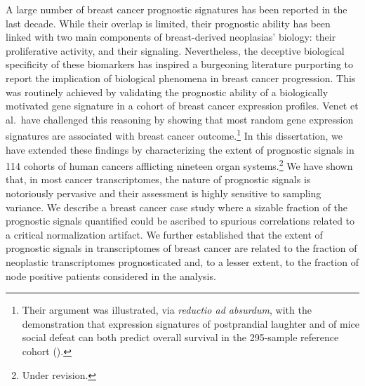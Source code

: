
A large number of breast cancer prognostic signatures has been reported in the
last decade.\cite{liu_breast_2014} While their overlap is limited, their
prognostic ability has been linked with two main components of breast-derived
neoplasias' biology: their proliferative activity, and their 
signaling.  Nevertheless, the deceptive biological specificity of these
biomarkers has inspired a burgeoning literature purporting to report the
implication of biological phenomena in breast cancer progression.  This was
routinely achieved by validating the prognostic ability of a biologically
motivated gene signature in a cohort of breast cancer expression
profiles.\cite{chang_gene_2004} Venet et al.~have challenged this reasoning by
showing that most random gene expression signatures are associated with breast
cancer outcome.\footnote{Their argument was illustrated, via \emph{reductio ad
    absurdum}, with the demonstration that expression signatures of postprandial
  laughter and of mice social defeat can both predict overall survival in the
  \mbox{295-sample}  reference cohort
  (\citealp{venet_most_2011}).}  In this dissertation, we have extended these
findings by characterizing the extent of prognostic signals in 114 cohorts of
human cancers afflicting nineteen organ systems.\footnote{Under revision.}  We
have shown that, in most cancer transcriptomes, the nature of prognostic signals
is notoriously pervasive and their assessment is highly sensitive to sampling
variance.  We describe a breast cancer case study where a sizable fraction of
the prognostic signals quantified could be ascribed to spurious correlations
related to a critical normalization artifact.  We further established that the
extent of prognostic signals in transcriptomes of breast cancer are related to
the fraction of  neoplastic transcriptomes prognosticated and, to
a lesser extent, to the fraction of node positive patients considered in the
analysis.

